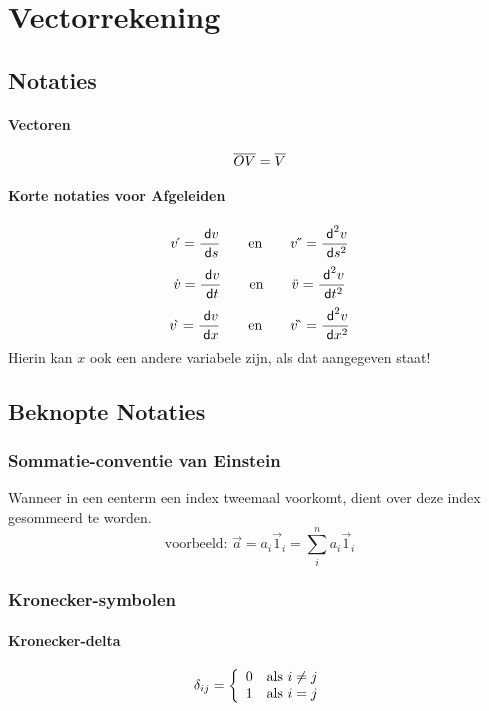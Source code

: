 \twocolumn
\newpage
\section{Vectorrekening}
\label{sec:Vectorrekening}

\subsection{Notaties}
\label{sec:Notaties}
  
  \paragraph{Vectoren}
  \label{sec:Vectoren}
  \[
    \overline{OV} = \overline{V}
  \]
  
  \paragraph{Korte notaties voor Afgeleiden}
  \label{sec:KorteNotatiesAfgeleiden}
  \[
    v \acute{}\, = \frac{\;\textsf{d}v}{\;\textsf{d}s} \qquad \mbox{en} \qquad v \acute{}\, \acute{}\, = \frac{\;\textsf{d}^2 v}{\;\textsf{d}s^2}
  \]
  \[
    \dot{v} = \frac{\;\textsf{d}v}{\;\textsf{d}t} \qquad \mbox{en} \qquad \ddot{v} = \frac{\;\textsf{d}^2 v}{\;\textsf{d}t^2}
  \]
  \[
    v \grave{}\, = \frac{\;\textsf{d}v}{\;\textsf{d}x} \qquad \mbox{en} \qquad v \grave{} \, \grave{}\, = \frac{\;\textsf{d}^2 v}{\;\textsf{d}x^2}
  \]
  Hierin kan $x$ ook een andere variabele zijn, als dat aangegeven staat!
  
\subsection{Beknopte Notaties}
\label{sec:BeknopteNotaties}

\subsubsection{Sommatie-conventie van Einstein}
\label{sec:SommatieConventieVanEinstein}
Wanneer in een eenterm een index tweemaal voorkomt, dient over deze index gesommeerd te worden.
\[
  \mbox{voorbeeld: }
  \vec{a} = a_i \vec{1}_i = \sum_i^n a_i \vec{1}_i
\]

\subsubsection{Kronecker-symbolen}
\label{sec:KroneckerSymbolen}

\paragraph{Kronecker-delta}
\label{sec:KroneckerDelta}
\[
  \delta_{ij} =
  \left\{
    \begin{array}[h]{cl}
	    0 & \mbox{als $i \neq j$}\\
	    1 & \mbox{als $i = j$}
    \end{array}
  \right.
\]
